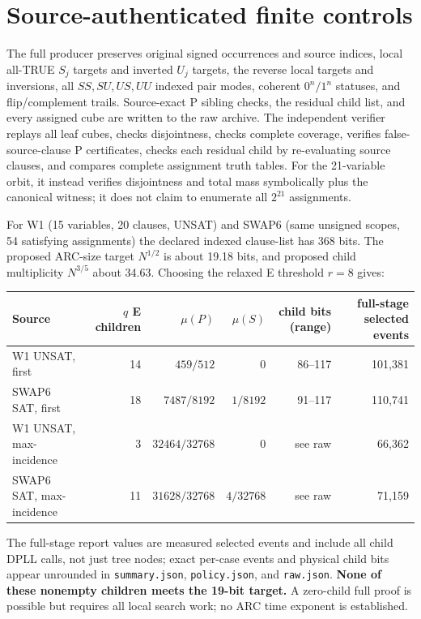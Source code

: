 \documentclass[10pt]{article}
\begin{document}
\section{Source-authenticated finite controls}
The full producer preserves original signed occurrences and source indices, local all-TRUE $S_j$ targets and inverted $U_j$ targets, the reverse local targets and inversions, all $SS,SU,US,UU$ indexed pair modes, coherent $0^n/1^n$ statuses, and flip/complement trails. Source-exact P sibling checks, the residual child list, and every assigned cube are written to the raw archive. The independent verifier replays all leaf cubes, checks disjointness, checks complete coverage, verifies false-source-clause P certificates, checks each residual child by re-evaluating source clauses, and compares complete assignment truth tables. For the 21-variable orbit, it instead verifies disjointness and total mass symbolically plus the canonical witness; it does not claim to enumerate all $2^{21}$ assignments.

For W1 (15 variables, 20 clauses, UNSAT) and SWAP6 (same unsigned scopes, 54 satisfying assignments) the declared indexed clause-list has 368 bits. The proposed ARC-size target $N^{1/2}$ is about 19.18 bits, and proposed child multiplicity $N^{3/5}$ about 34.63. Choosing the relaxed E threshold $r=8$ gives:
\begin{center}\small
\begin{tabular}{lrrrrr}
\toprule Source&$q$ E children&$\mu(P)$&$\mu(S)$&child bits (range)&full-stage selected events\\\midrule
W1 UNSAT, first&14&$459/512$&$0$&86--117&101,381\\
SWAP6 SAT, first&18&$7487/8192$&$1/8192$&91--117&110,741\\
W1 UNSAT, max-incidence&3&$32464/32768$&$0$&see raw&66,362\\
SWAP6 SAT, max-incidence&11&$31628/32768$&$4/32768$&see raw&71,159\\\bottomrule
\end{tabular}
\end{center}
The full-stage report values are measured selected events and include all child DPLL calls, not just tree nodes; exact per-case events and physical child bits appear unrounded in \texttt{summary.json}, \texttt{policy.json}, and \texttt{raw.json}. \textbf{None of these nonempty children meets the 19-bit target.} A zero-child full proof is possible but requires all local search work; no ARC time exponent is established.
\end{document}
